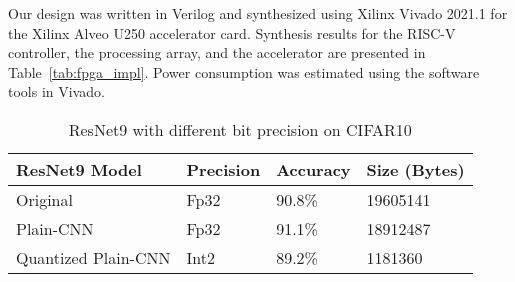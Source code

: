 \documentclass[sigconf]{acmart}
\begin{document}
Our design was written in Verilog and synthesized using Xilinx Vivado 2021.1 
for the Xilinx Alveo U250 accelerator card. 
Synthesis results for the  RISC-V controller, the processing array, and the accelerator are presented in Table~\ref{tab:fpga_impl}. 
Power consumption was estimated using the software tools in Vivado.




\begin{table}[]
\centering

\caption{ResNet9 with different bit precision on CIFAR10}
\begin{tabular}{|l|l|l|l|}
\hline
ResNet9 Model                  & Precision & Accuracy & Size (Bytes)\\ \hline\hline
Original       & Fp32      &     90.8\%     & 19605141\\ \hline
Plain-CNN & Fp32      &       91.1\%   & 18912487\\ \hline
Quantized Plain-CNN  & Int2      & 89.2\% & 1181360\\ \hline
\end{tabular}
\label{tab:resnet9_quant}
\end{table}
\end{document}
